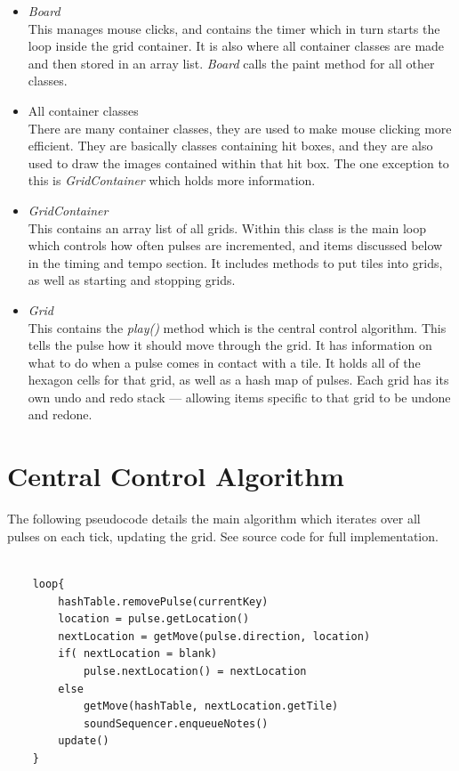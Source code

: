 \documentclass[10pt,a4paper]{article}
\begin{document}
\begin{itemize}
\item \textit{Board}\\
This manages mouse clicks, and contains the timer which in turn starts the loop inside the grid container. It is also where all container classes are made and then stored in an array list. \textit{Board} calls the paint method for all other classes.

\item All container classes \\
There are many container classes, they are used to make mouse clicking more efficient. They are basically classes containing hit boxes, and they are also used to draw the images contained within that hit box. The one exception to this is \textit{GridContainer} which holds more information.

\item \textit{GridContainer} \\
This contains an array list of all grids. Within this class is the main loop which controls how often pulses are incremented, and items discussed below in the timing and tempo section. It includes methods to put tiles into grids, as well as starting and stopping grids.

\item \textit{Grid} \\
This contains the \textit{play()} method which is the central control algorithm. This tells the pulse how it should move through the grid. It has information on what to do when a pulse comes in contact with a tile. It holds all of the hexagon cells for that grid, as well as a hash map of pulses. Each grid has its own undo and redo stack --- allowing items specific to that grid to be undone and redone.
\end{itemize}

\section{Central Control Algorithm}
The following pseudocode details the main algorithm which iterates over all pulses on each tick, updating the grid. See source code for full implementation.
\begin{verbatim}

    loop{
        hashTable.removePulse(currentKey)
        location = pulse.getLocation()
        nextLocation = getMove(pulse.direction, location)
        if( nextLocation = blank)
            pulse.nextLocation() = nextLocation
        else
            getMove(hashTable, nextLocation.getTile) 
            soundSequencer.enqueueNotes()
        update()
    }

\end{verbatim}
\end{document}
